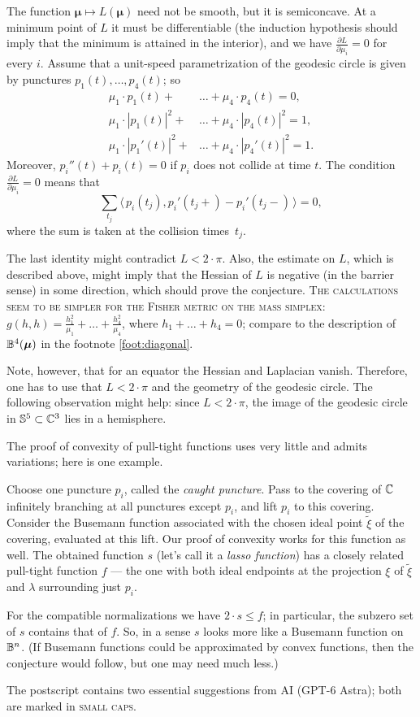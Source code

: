 \documentclass[a4paper,10pt]{article}
\begin{document}
The function $\bm{\mu}\mapsto L(\bm{\mu})$ need not be smooth,
but it is semiconcave.
At a minimum point of $L$ it must be differentiable (the induction hypothesis should imply that the minimum is attained in the interior), and we have $\frac{\partial L}{\partial \mu_i}=0$ for every $i$.
Assume that a unit-speed parametrization of the geodesic circle is given by punctures $p_1(t),\ldots,p_4(t)$; so
\begin{align*}
\mu_1\cdot p_1(t)+&\ldots+ \mu_4\cdot p_4(t)=0,
\\ \mu_1\cdot|p_1(t)|^2+&\ldots+ \mu_4\cdot|p_4(t)|^2=1,
\\ \mu_1\cdot|p_1'(t)|^2+&\ldots+ \mu_4\cdot|p_4'(t)|^2=1.
\end{align*}
Moreover, $p_i''(t)+p_i(t)=0$ if $p_i$ does not collide at time $t$.
The condition $\frac{\partial L}{\partial \mu_i}=0$ means that
\[\sum_{t_j}\langle\, p_i(t_j),p_i'(t_j+)-p_i'(t_j-)\, \rangle=0,\]
where the sum is taken at the collision times~$t_j$.

The last identity might contradict $L<2\cdot\pi$.
Also, the estimate on $L$, which is described above, might imply that the Hessian of $L$ is negative (in the barrier sense) in some direction, which should prove the conjecture.
\textsc{The calculations seem to be simpler for the Fisher metric on the mass simplex:} $g(h,h)=\tfrac{h_1^2}{\mu_1}+\ldots+\tfrac{h_4^2}{\mu_4}$, where $h_1+\ldots+h_4=0$; compare to the description of $\mathbb{B}^4(\bm{\mu})$ in the footnote \ref{foot:diagonal}.

Note, however, that for an equator the Hessian and Laplacian vanish.
Therefore, one has to use that $L<2\cdot\pi$ and the geometry of the geodesic circle.
The following observation might help: since $L<2\cdot\pi$, the image of the geodesic circle in $\mathbb{S}^5\subset \mathbb{C}^3$ lies in a hemisphere.

The proof of convexity of pull-tight functions uses very little and admits variations;
here is one example.

Choose one puncture $p_i$, called the \emph{caught puncture}.
Pass to the covering of $\mathbb{C}$ infinitely branching at all punctures except $p_i$, and lift $p_i$ to this covering.
Consider the Busemann function associated with the chosen ideal point $\tilde \xi$ of the covering, evaluated at this lift.
Our proof of convexity works for this function as well.
The obtained function $s$ (let's call it a \emph{lasso function})
has a closely related pull-tight function $f$ --- the one with both ideal endpoints at the projection $\xi$ of $\tilde \xi$ and $\lambda$ surrounding just $p_i$.

For the compatible normalizations we have $2\cdot s\le f$; in particular, the subzero set of $s$ contains that of $f$.
So, in a sense $s$ looks more like a Busemann function on $\mathbb{B}^n$.
(If Busemann functions could be approximated by convex functions, then the conjecture would follow, but one may need much less.)

The postscript contains two essential suggestions from AI (GPT-6 Astra); both are marked in \textsc{small caps}.

{\sloppy
\def\emph{\textit}
\printbibliography[heading=bibintoc]
\fussy
}
\end{document}
